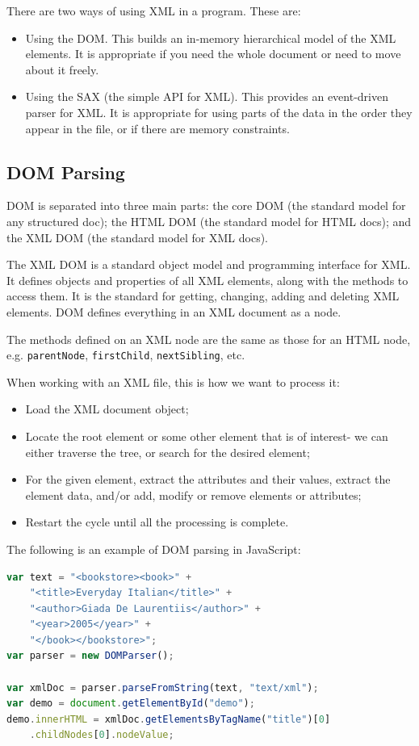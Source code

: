 \documentclass[a4paper, openany]{memoir}
\begin{document}
There are two ways of using XML in a program. These are:
\begin{itemize}
    \item Using the DOM. This builds an in-memory hierarchical model of the XML elements. It is appropriate if you need the whole document or need to move about it freely.
    \item Using the SAX (the simple API for XML). This provides an event-driven parser for XML. It is appropriate for using parts of the data in the order they appear in the file, or if there are memory constraints.
\end{itemize}

\subsection{DOM Parsing}
DOM is separated into three main parts: the core DOM (the standard model for any structured doc); the HTML DOM (the standard model for HTML docs); and the XML DOM (the standard model for XML docs).

The XML DOM is a standard object model and programming interface for XML. It defines objects and properties of all XML elements, along with the methods to access them. It is the standard for getting, changing, adding and deleting XML elements. DOM defines everything in an XML document as a node.

The methods defined on an XML node are the same as those for an HTML node, e.g. \texttt{parentNode}, \texttt{firstChild}, \texttt{nextSibling}, etc.

When working with an XML file, this is how we want to process it:
\begin{itemize}
    \item Load the XML document object;
    \item Locate the root element or some other element that is of interest- we can either traverse the tree, or search for the desired element;
    \item For the given element, extract the attributes and their values, extract the element data, and/or add, modify or remove elements or attributes;
    \item Restart the cycle until all the processing is complete.
\end{itemize}
The following is an example of DOM parsing in JavaScript:
\begin{lstlisting}[language=javascript]
var text = "<bookstore><book>" + 
    "<title>Everyday Italian</title>" + 
    "<author>Giada De Laurentiis</author>" + 
    "<year>2005</year>" + 
    "</book></bookstore>";
var parser = new DOMParser();

var xmlDoc = parser.parseFromString(text, "text/xml");
var demo = document.getElementById("demo");
demo.innerHTML = xmlDoc.getElementsByTagName("title")[0]
    .childNodes[0].nodeValue;
\end{lstlisting}
\end{document}
